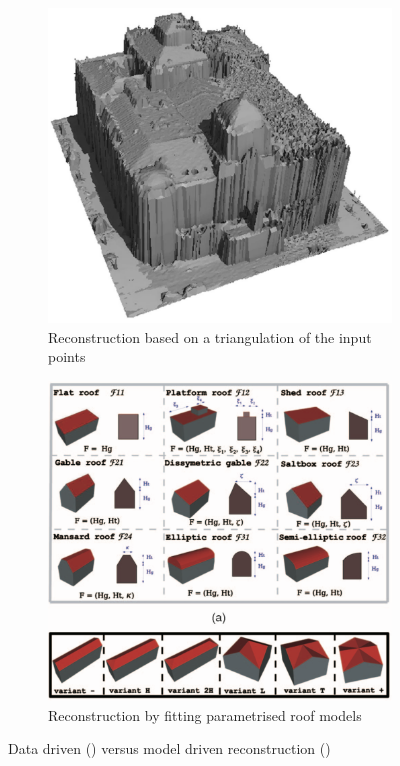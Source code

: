 \begin{figure}
	\centering
	\begin{subfigure}[b]{0.45\linewidth}
		\includegraphics[width=\linewidth]{figs/data-driven.png}
		\caption{Reconstruction based on a triangulation of the input points \citep{Axelsson99}}%
		\label{subfig:data-driven}
	\end{subfigure}
	\quad
	\begin{subfigure}[b]{0.45\linewidth}
		\includegraphics[width=\linewidth]{figs/model-driven.png}
		\caption{Reconstruction by fitting parametrised roof models \citep{Lafarge10}}%
		\label{subfig:model-driven}
	\end{subfigure}
	\caption{Data driven () versus model driven reconstruction ()}%
	\label{fig:data-vs-model-driven}
\end{figure}

